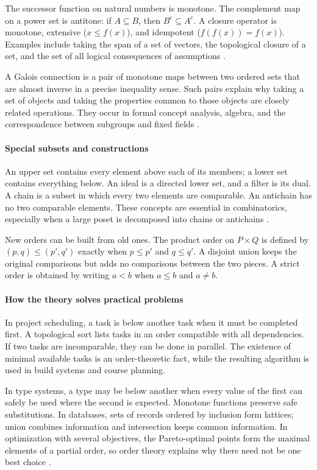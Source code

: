 The successor function on natural numbers is monotone. The complement map on a power set is antitone: if $A\subseteq B$, then $B^c\subseteq A^c$. A closure operator is monotone, extensive ($x\leq f(x)$), and idempotent ($f(f(x))=f(x)$). Examples include taking the span of a set of vectors, the topological closure of a set, and the set of all logical consequences of assumptions \cite{order_theory_ref3}.

A Galois connection is a pair of monotone maps between two ordered sets that are almost inverse in a precise inequality sense. Such pairs explain why taking a set of objects and taking the properties common to those objects are closely related operations. They occur in formal concept analysis, algebra, and the correspondence between subgroups and fixed fields \cite{order_theory_ref4}.

\paragraph{Special subsets and constructions}
An upper set contains every element above each of its members; a lower set contains everything below. An ideal is a directed lower set, and a filter is its dual. A chain is a subset in which every two elements are comparable. An antichain has no two comparable elements. These concepts are essential in combinatorics, especially when a large poset is decomposed into chains or antichains \cite{order_theory_ref1}.

New orders can be built from old ones. The product order on $P\times Q$ is defined by $(p,q)\leq(p',q')$ exactly when $p\leq p'$ and $q\leq q'$. A disjoint union keeps the original comparisons but adds no comparisons between the two pieces. A strict order is obtained by writing $a<b$ when $a\leq b$ and $a\ne b$.

\paragraph{How the theory solves practical problems}
In project scheduling, a task is below another task when it must be completed first. A topological sort lists tasks in an order compatible with all dependencies. If two tasks are incomparable, they can be done in parallel. The existence of minimal available tasks is an order-theoretic fact, while the resulting algorithm is used in build systems and course planning.

In type systems, a type may be below another when every value of the first can safely be used where the second is expected. Monotone functions preserve safe substitutions. In databases, sets of records ordered by inclusion form lattices; union combines information and intersection keeps common information. In optimization with several objectives, the Pareto-optimal points form the maximal elements of a partial order, so order theory explains why there need not be one best choice \cite{order_theory_ref3}.

